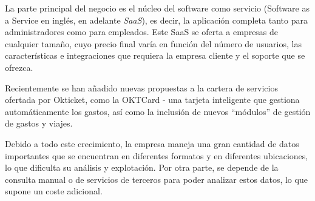 La parte principal del negocio es el núcleo del software como servicio (Software as a
Service en inglés, en adelante \textit{SaaS}), es decir, la aplicación completa tanto
para administradores como para empleados. Este SaaS se oferta a empresas de cualquier
tamaño, cuyo precio final varía en función del número de usuarios, las características
e integraciones que requiera la empresa cliente y el soporte que se ofrezca.

Recientemente se han añadido nuevas propuestas a la cartera de servicios ofertada por
Okticket, como la OKTCard {-} una tarjeta inteligente que gestiona automáticamente los gastos,
así como la inclusión de nuevos ``módulos'' de gestión de gastos y viajes.

Debido a todo este crecimiento, la empresa maneja una gran cantidad de datos importantes que se
encuentran en diferentes formatos y en diferentes ubicaciones, lo que dificulta su análisis y
explotación. Por otra parte, se depende de la consulta manual o de servicios de terceros para
poder analizar estos datos, lo que supone un coste adicional.
